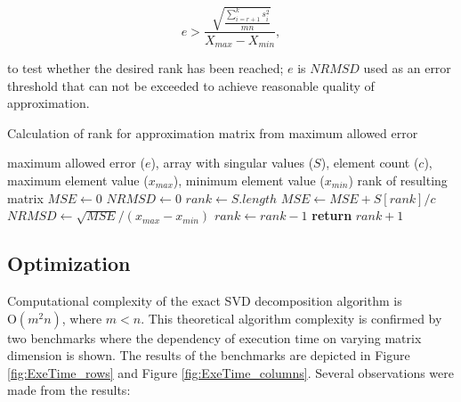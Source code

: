 \begin{equation}
e > \frac{\sqrt[]{\frac{\sum_{i=r+1}^{k} s_{i}^{2}}{m n}}}{X_{max}-X_{min}},
\end{equation}

\noindent
to test whether the desired rank has been reached; $e$ is $\mathit{NRMSD}$ used as an error threshold that can not be exceeded to achieve reasonable quality of approximation.

\begin{algorithm}
  \caption{Calculation of rank for approximation matrix from maximum allowed error}\label{rankAlgorithm}
  \label{alg:rank-calculation}
  \begin{algorithmic}[1]
  	\INPUT maximum allowed error ($e$), array with singular values ($S$), element count ($c$), maximum element value ($x_{max}$), minimum element value ($x_{min}$)
    \OUTPUT rank of resulting matrix
      \State $\mathit{MSE} \gets 0$
      \State $\mathit{NRMSD} \gets 0$
      \State $rank \gets S.length$
        \State $\mathit{MSE} \gets \mathit{MSE} + S[rank]/c$ 
        \State $\mathit{NRMSD} \gets \sqrt{\mathit{MSE}} / (x_{max} - x_{min})$ 
        \State $rank \gets rank - 1$ 
      \EndWhile
      \State \textbf{return} $rank + 1$ 
    \EndProcedure
  \end{algorithmic}
\end{algorithm}

\subsection{Optimization}


Computational complexity of the exact SVD decomposition algorithm is $\mathrm{O}(m^2n)$, where $m<n$. This theoretical algorithm complexity is confirmed by two benchmarks where the dependency of execution time on varying matrix dimension is shown. The results of the benchmarks are depicted in Figure \ref{fig:ExeTime_rows} and Figure \ref{fig:ExeTime_columns}. Several observations were made from the results:

